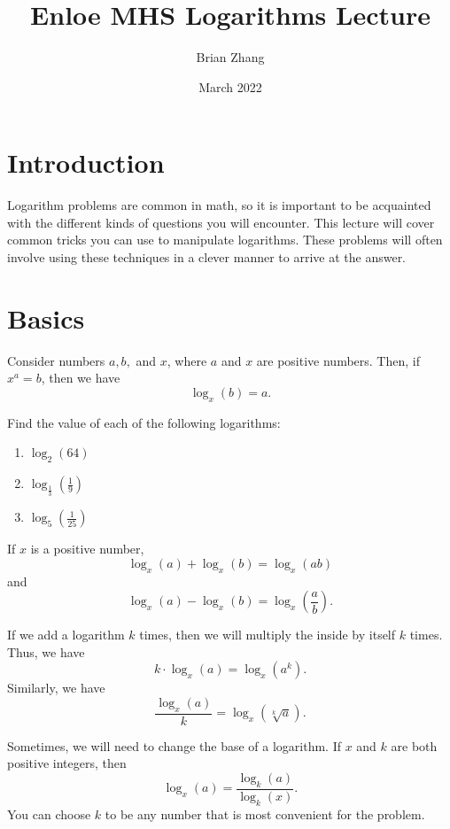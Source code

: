 \documentclass[sexy]{scrartcl}
\title{Enloe MHS Logarithms Lecture}
\author{Brian Zhang}
\date{March 2022}
\begin{document}
\maketitle

\section{Introduction}
Logarithm problems are common in math, so it is important to be acquainted with the different kinds of questions you will encounter. This lecture will cover common tricks you can use to manipulate logarithms. These problems will often involve using these techniques in a clever manner to arrive at the answer. 

\section{Basics}
\begin{definition}[Logarithm]
Consider numbers $a, b, $ and $x$, where $a$ and $x$ are positive numbers. Then, if $x^a=b$, then we have \[\log_x(b)=a.\]
\end{definition}

\begin{exercise} 
Find the value of each of the following logarithms:
\begin{enumerate}[label=\alph*]
    \item $\log_2(64)$
    \item $\log_{\frac13}(\frac19)$
    \item $\log_5(\frac{1}{25})$
\end{enumerate}
\end{exercise}

\begin{theorem}
If $x$ is a positive number, 
\[\log_x(a)+\log_x(b)=\log_x(ab)\]
and 
\[\log_x(a)-\log_x(b)=\log_x\left(\frac{a}{b}\right).\]
\end{theorem}

\begin{theorem}
If we add a logarithm $k$ times, then we will multiply the inside by itself $k$ times. Thus, we have
\[k\cdot\log_x(a)=\log_x\left(a^k\right).\]
Similarly, we have
\[\frac{\log_x(a)}{k} = \log_x(\sqrt[k]a).\]
\end{theorem}

\begin{theorem}
Sometimes, we will need to change the base of a logarithm. If $x$ and $k$ are both positive integers, then 
\[\log_x(a)=\frac{\log_k(a)}{\log_k(x)}.\]
You can choose $k$ to be any number that is most convenient for the problem.
\end{theorem}
\end{document}
